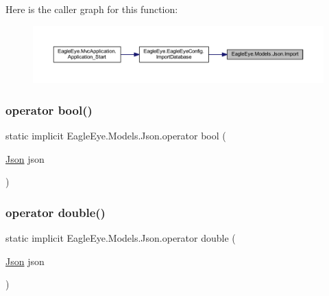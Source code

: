 Here is the caller graph for this function\+:\nopagebreak
\begin{figure}[H]
\begin{center}
\leavevmode
\includegraphics[width=350pt]{class_eagle_eye_1_1_models_1_1_json_ae79a899679f529bfebb18683afd1c9d1_icgraph}
\end{center}
\end{figure}
\mbox{\label{class_eagle_eye_1_1_models_1_1_json_a396aab5debc375cb57b9e2ce58c932fd}} 
\subsubsection{\texorpdfstring{operator bool()}{operator bool()}}
{\footnotesize\ttfamily static implicit Eagle\+Eye.\+Models.\+Json.\+operator bool (\begin{DoxyParamCaption}\item[{\mbox{\hyperlink{class_eagle_eye_1_1_models_1_1_json}{Json}}}]{json }\end{DoxyParamCaption})\hspace{0.3cm}{\ttfamily [static]}}

\mbox{\label{class_eagle_eye_1_1_models_1_1_json_aa26017e55f0d47af0b446c02c0899102}} 
\subsubsection{\texorpdfstring{operator double()}{operator double()}}
{\footnotesize\ttfamily static implicit Eagle\+Eye.\+Models.\+Json.\+operator double (\begin{DoxyParamCaption}\item[{\mbox{\hyperlink{class_eagle_eye_1_1_models_1_1_json}{Json}}}]{json }\end{DoxyParamCaption})\hspace{0.3cm}{\ttfamily [static]}}

